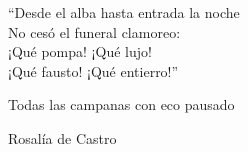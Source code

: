 \begin{dedication}

``Desde el alba hasta entrada la noche\\
No cesó el funeral clamoreo:\\
¡Qué pompa! ¡Qué lujo!\\
¡Qué fausto! ¡Qué entierro!''

Todas las campanas con eco pausado

Rosalía de Castro
\end{dedication}
